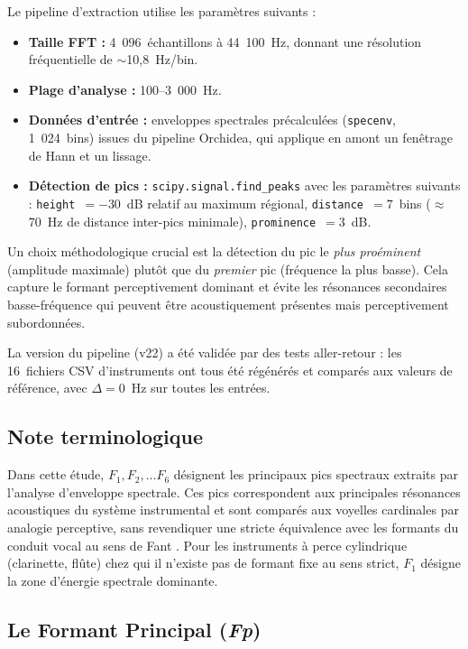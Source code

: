 \documentclass[12pt,a4paper]{article}
\begin{document}
Le pipeline d'extraction utilise les paramètres suivants :

\begin{itemize}
\item \textbf{Taille FFT :} 4~096~échantillons à 44~100~Hz, donnant une résolution
fréquentielle de $\sim$10,8~Hz/bin.
\item \textbf{Plage d'analyse :} 100--3~000~Hz.
\item \textbf{Données d'entrée :} enveloppes spectrales précalculées (\texttt{specenv},
1~024~bins) issues du pipeline Orchidea, qui applique en amont un fenêtrage de Hann
et un lissage.
\item \textbf{Détection de pics :} \texttt{scipy.signal.find\_peaks} avec les
paramètres suivants : \texttt{height}~$= -30$~dB relatif au maximum régional,
\texttt{distance}~$= 7$~bins ($\approx$70~Hz de distance inter-pics minimale),
\texttt{prominence}~$= 3$~dB.
\end{itemize}

Un choix méthodologique crucial est la détection du pic le \emph{plus proéminent}
(amplitude maximale) plutôt que du \emph{premier} pic (fréquence la plus basse).
Cela capture le formant perceptivement dominant et évite les résonances secondaires
basse-fréquence qui peuvent être acoustiquement présentes mais perceptivement
subordonnées.

La version du pipeline (v22) a été validée par des tests aller-retour : les
16~fichiers CSV d'instruments ont tous été régénérés et comparés aux valeurs de
référence, avec $\Delta = 0$~Hz sur toutes les entrées.

\subsection{Note terminologique}

Dans cette étude, $F_1, F_2, \ldots F_6$ désignent les principaux pics spectraux
extraits par l'analyse d'enveloppe spectrale. Ces pics correspondent aux principales
résonances acoustiques du système instrumental et sont comparés aux voyelles
cardinales par analogie perceptive, sans revendiquer une stricte équivalence avec
les formants du conduit vocal au sens de Fant \citep{Fant1960}. Pour les instruments
à perce cylindrique (clarinette, flûte) chez qui il n'existe pas de formant fixe au
sens strict, $F_1$ désigne la zone d'énergie spectrale dominante.

\subsection{Le Formant Principal (\textit{Fp})}
\label{sec:fp}
\end{document}
